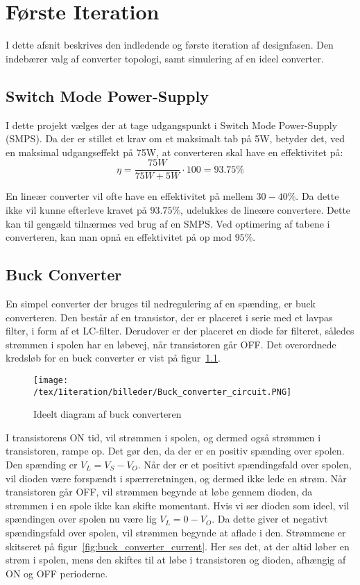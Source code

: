
\chapter{Første Iteration}
I dette afsnit beskrives den indledende og første iteration af designfasen. Den indebærer valg af converter topologi, samt simulering af en ideel converter.

\section{Switch Mode Power-Supply}
I dette projekt vælges der at tage udgangspunkt i Switch Mode Power-Supply (SMPS). Da der er stillet et krav om et maksimalt tab på 5W, betyder det, ved en maksimal udgangseffekt på 75W, at converteren skal have en effektivitet på:
\begin{equation}
	\eta = \frac{75W}{75W + 5W} \cdot 100 = 93.75\percent
\end{equation}

En lineær converter vil ofte have en effektivitet på mellem $30-40\percent$. Da dette ikke vil kunne efterleve kravet på $93.75\percent$, udelukkes de lineære convertere. Dette kan til gengæld tilnærmes ved brug af en SMPS. Ved optimering af tabene i converteren, kan man opnå en effektivitet på op mod $95\percent$\cite{smps}.


\section{Buck Converter}
En simpel converter der bruges til nedregulering af en spænding, er buck converteren. Den består af en transistor, der er placeret i serie med et lavpas filter, i form af et LC-filter. Derudover er der placeret en diode før filteret, således strømmen i spolen har en løbevej, når transistoren går OFF. Det overordnede kredsløb for en buck converter er vist på figur~\ref{fig:buck_converter_circuit}.


\begin{figure}[H]
	\center
	\texttt{[image: /tex/1iteration/billeder/Buck\_converter\_circuit.PNG]}
	\caption{Ideelt diagram af buck converteren
		\cite{buck-converter}}
	\label{fig:buck_converter_circuit}
\end{figure}


I transistorens ON tid, vil strømmen i spolen, og dermed også strømmen i transistoren, rampe op. Det gør den, da der er en positiv spænding over spolen. Den spænding er $V_L=V_S-V_O$. Når der er et positivt spændingsfald over spolen, vil dioden være forspændt i spærreretningen, og dermed ikke lede en strøm. Når transistoren går OFF, vil strømmen begynde at løbe gennem dioden, da strømmen i en spole ikke kan skifte momentant. Hvis vi ser dioden som ideel, vil spændingen over spolen nu være lig $V_L=0-V_O$. Da dette giver et negativt spændingsfald over spolen, vil strømmen begynde at aflade i den. Strømmene er skitseret på figur~\ref{fig:buck_converter_current}. Her ses det, at der altid løber en strøm i spolen, mens den skiftes til at løbe i transistoren og dioden, afhængig af ON og OFF perioderne. 


